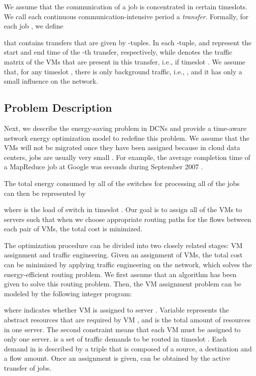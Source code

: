 \documentclass[journal,single-space,two column,twoside,10pt]{IEEEtran}
\begin{document}
We assume that the communication of a job is concentrated in certain timeslots.
We call each continuous communication-intensive period a \emph{transfer}. Formally, for each job , we define

that contains  transfers that are given by -tuples. In each -tuple,
 and  represent the start and end time of the -th transfer, respectively, while
 denotes the traffic matrix of the VMs
that are present in this transfer, i.e.,  if timeslot . We assume that, for any timeslot , there is only background traffic, i.e., , and it has only a small influence on the network.


\subsection{Problem Description}

Next, we describe the energy-saving problem in DCNs and provide a time-aware network energy optimization model to redefine this problem. We assume that the VMs
will not be migrated once they have been assigned because in cloud data centers, jobs are usually very small \cite{Xie_Ding-2012}. For example, the average completion time of a MapReduce job at Google was  seconds during September 2007 \cite{Dean_Chemawat-2008}. 

The total energy consumed by all of the switches for processing all of the jobs can then be represented by

where  is the load of switch  in timeslot . Our goal is to assign all of the VMs to servers such that when we choose appropriate routing paths for the flows between each pair of VMs, the total cost  is minimized.

The optimization procedure can be divided into two closely related stages: VM assignment and traffic engineering. Given an assignment of VMs, the total cost can be minimized by applying traffic engineering on the network, which solves the energy-efficient routing problem. We first assume that an algorithm  has been given to solve this routing problem. Then, the VM assignment problem can be modeled by the following integer program:

where  indicates whether VM  is assigned to server . Variable  represents the abstract resources that are required by VM , and  is the total amount of resources in one server. The second constraint means that each VM must be assigned to only one server.  is a set of traffic demands to be routed in timeslot . Each demand in  is described by a triple that is composed of a source, a destination and a flow amount. Once an assignment is given,  can be obtained by the active transfer of jobs.
\end{document}

